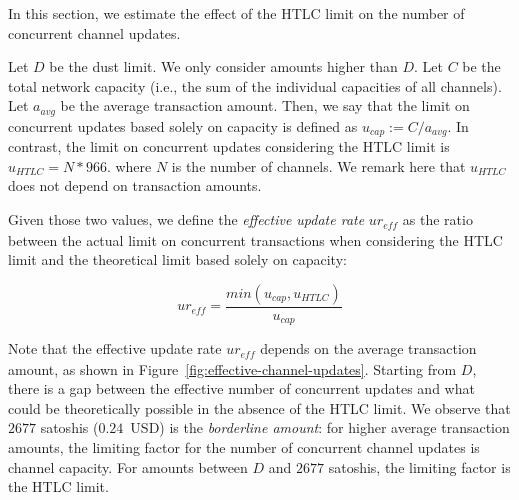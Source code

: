 In this section, we estimate the effect of the HTLC limit on the number of concurrent channel updates.



Let $D$ be the dust limit.
We only consider amounts higher than $D$.
Let $C$ be the total network capacity (i.e., the sum of the individual capacities of all channels).
Let $a_\textit{avg}$ be the average transaction amount. 
Then, we say that the limit on concurrent updates based solely on capacity is defined as   
$u_\textit{cap} := C / a_\textit{avg}$.
In contrast, the limit on concurrent updates 
considering the HTLC limit is $u_\textit{HTLC} = N * 966$.
where $N$ is the number of channels. We remark here that $u_\textit{HTLC}$ does not depend on transaction amounts.

Given those two values, we define the 
\textit{effective update rate} $ur_\textit{eff}$ as the ratio between the actual limit on concurrent 
transactions when considering the HTLC limit and the theoretical 
limit based solely on capacity:

\[ur_\textit{eff} = \frac{min(u_\textit{cap}, u_\textit{HTLC})}{u_\textit{cap}}\]

Note that the effective update rate $ur_\textit{eff}$ depends on 
the average transaction amount, as shown in Figure~\ref{fig:effective-channel-updates}.
Starting from $D$, there is a gap between the effective number of concurrent updates and what could be theoretically possible in the absence of the HTLC limit. 
We observe that $2677$ satoshis ($0.24$~USD) is the \textit{borderline amount}: for higher average transaction amounts, 
the limiting factor for the number of concurrent channel updates is channel capacity.
For amounts between $D$ and $2677$ satoshis, the limiting factor is the HTLC limit.

